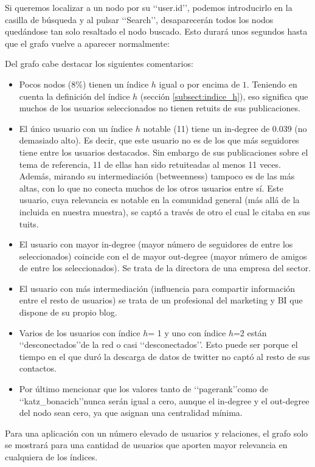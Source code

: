 Si queremos localizar a un nodo por su \lq\lq user.id\rq\rq, podemos introducirlo en la
casilla de búsqueda y al pulsar \lq\lq Search\rq\rq, desaparecerán todos los nodos 
quedándose tan solo resaltado el nodo buscado. 
Esto durará unos segundos hasta que el grafo vuelve a aparecer normalmente:


Del grafo cabe destacar los siguientes comentarios:
\begin{itemize}
\item Pocos nodos ($8$\%) tienen un índice $h$ igual o por encima de $1$. Teniendo en cuenta 
la definición del índice $h$ (sección \ref{subsect:indice_h}), eso significa que muchos de los 
usuarios seleccionados no tienen retuits de sus publicaciones.

\item El único usuario con un índice $h$ notable (11) tiene un in-degree de $0.039$ (no demasiado alto). 
Es decir, que este usuario no es de los que más seguidores tiene entre los usuarios destacados. Sin
embargo de sus publicaciones sobre el tema de referencia, 11 de ellas han sido retuiteadas al menos
11 veces. Además, mirando su intermediación (betweenness) tampoco es de las más altas, con lo que 
no conecta muchos de los otros usuarios entre sí. Este usuario, cuya relevancia es notable en la comunidad
general (más allá de la incluida en nuestra muestra), se captó a través de otro el cual le citaba en 
sus tuits. 


\item El usuario con mayor in-degree (mayor número de seguidores de entre los seleccionados) coincide 
con el de mayor out-degree (mayor número de amigos de entre los seleccionados). Se trata de la 
directora de una empresa del sector. 

\item El usuario con más intermediación (influencia para compartir información entre el resto de usuarios) se trata de un profesional del marketing y BI que dispone de su propio blog.


\item Varios de los usuarios con índice $h$= 1 y uno con índice $h$=2 están \lq\lq desconectados\rq\rq de la red o casi \lq\lq desconectados\rq\rq. Esto puede ser porque el tiempo en el que duró la descarga de datos de twitter no captó al resto de sus contactos.


\item Por último mencionar que los valores tanto de \lq\lq pagerank\rq\rq como de
\lq\lq katz\_bonacich\rq\rq nunca serán igual a cero, aunque el in-degree y el out-degree del nodo 
sean cero, ya que asignan una centralidad mínima.
\end{itemize}

Para una aplicación con un número elevado de usuarios y relaciones, 
el grafo solo se mostrará para una cantidad de usuarios que aporten 
mayor relevancia en cualquiera de los índices.